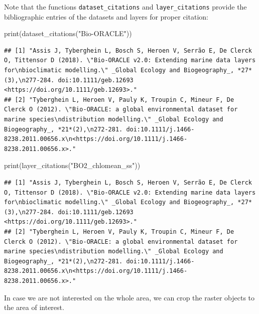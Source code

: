 \documentclass[
]{book}
\newenvironment{Shaded}{\begin{snugshade}}{\end{snugshade}}
\newcommand{\FunctionTok}[1]{\textcolor[rgb]{0.00,0.00,0.00}{#1}}
\newcommand{\NormalTok}[1]{#1}
\newcommand{\StringTok}[1]{\textcolor[rgb]{0.31,0.60,0.02}{#1}}
\begin{document}
Note that the functions \texttt{dataset\_citations} and \texttt{layer\_citations} provide the bibliographic entries of the datasets and layers for proper citation:

\begin{Shaded}
\begin{Highlighting}[]
\FunctionTok{print}\NormalTok{(}\FunctionTok{dataset\_citations}\NormalTok{(}\StringTok{"Bio{-}ORACLE"}\NormalTok{))}
\end{Highlighting}
\end{Shaded}

\begin{verbatim}
## [1] "Assis J, Tyberghein L, Bosch S, Heroen V, Serrão E, De Clerck O, Tittensor D (2018). \"Bio‐ORACLE v2.0: Extending marine data layers for\nbioclimatic modelling.\" _Global Ecology and Biogeography_, *27*(3),\n277-284. doi:10.1111/geb.12693 <https://doi.org/10.1111/geb.12693>."                                 
## [2] "Tyberghein L, Heroen V, Pauly K, Troupin C, Mineur F, De Clerck O (2012). \"Bio-ORACLE: a global environmental dataset for marine species\ndistribution modelling.\" _Global Ecology and Biogeography_, *21*(2),\n272-281. doi:10.1111/j.1466-8238.2011.00656.x\n<https://doi.org/10.1111/j.1466-8238.2011.00656.x>."
\end{verbatim}

\begin{Shaded}
\begin{Highlighting}[]
\FunctionTok{print}\NormalTok{(}\FunctionTok{layer\_citations}\NormalTok{(}\StringTok{"BO2\_chlomean\_ss"}\NormalTok{))}
\end{Highlighting}
\end{Shaded}

\begin{verbatim}
## [1] "Assis J, Tyberghein L, Bosch S, Heroen V, Serrão E, De Clerck O, Tittensor D (2018). \"Bio‐ORACLE v2.0: Extending marine data layers for\nbioclimatic modelling.\" _Global Ecology and Biogeography_, *27*(3),\n277-284. doi:10.1111/geb.12693 <https://doi.org/10.1111/geb.12693>."                                 
## [2] "Tyberghein L, Heroen V, Pauly K, Troupin C, Mineur F, De Clerck O (2012). \"Bio-ORACLE: a global environmental dataset for marine species\ndistribution modelling.\" _Global Ecology and Biogeography_, *21*(2),\n272-281. doi:10.1111/j.1466-8238.2011.00656.x\n<https://doi.org/10.1111/j.1466-8238.2011.00656.x>."
\end{verbatim}

In case we are not interested on the whole area, we can crop the raster objects to the area of interest.
\end{document}
